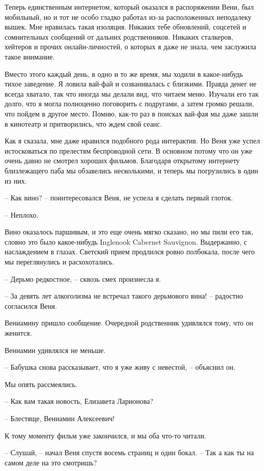 \documentclass[
]{book}
\begin{document}
Теперь единственным интернетом, который оказался в распоряжении Вени, был мобильный, но и тот не особо гладко работал из-за расположенных неподалеку вышек. Мне нравилась такая изоляция. Никаких тебе обновлений, соцсетей и сомнительных сообщений от дальних родственников. Никаких сталкеров, хейтеров и прочих онлайн-личностей, о которых я даже не знала, чем заслужила такое внимание.

Вместо этого каждый день, в одно и то же время, мы ходили в какое-нибудь тихое заведение. Я ловила вай-фай и созванивалась с близкими. Правда денег не всегда хватало, так что иногда мы делали вид, что читаем меню. Изучали его так долго, что я могла полноценно поговорить с подругами, а затем громко решали, что пойдем в другое место. Помню, как-то раз в поисках вай-фая мы даже зашли в кинотеатр и притворились, что ждем свой сеанс.

Как я сказала, мне даже нравился подобного рода интерактив. Но Веня уже успел истосковаться по прелестям беспроводной сети. В основном потому что он уже очень давно не смотрел хороших фильмов. Благодаря открытому интернету близлежащего паба мы обзавелись несколькими, и теперь мы погрузились в один из них.

-- Как вино? -- поинтересовался Веня, не успела я сделать первый глоток.

-- Неплохо.

Вино оказалось паршивым, и это еще очень мягко сказано, но мы пили его так, словно это было какое-нибудь Inglenook Cabernet Sauvignon. Выдержанно, с наслаждением в глазах. Светский прием продлился ровно полбокала, после чего мы переглянулись и расхохотались.

-- Дерьмо редкостное, -- сквозь смех произнесла я.

-- За девять лет алкоголизма не встречал такого дерьмового вина! -- радостно согласился Веня.

Вениамину пришло сообщение. Очередной родственник удивлялся тому, что он женится.

Вениамин удивлялся не меньше.

-- Бабушка снова рассказывает, что я уже живу с невестой, -- объяснил он.

Мы опять рассмеялись.

-- Как вам такая новость, Елизавета Ларионова?

-- Блестяще, Вениамин Алексеевич!

К тому моменту фильм уже закончился, и мы оба что-то читали.

-- Слушай, -- начал Веня спустя восемь страниц и один бокал. -- Так а как ты на самом деле на это смотришь?
\end{document}
